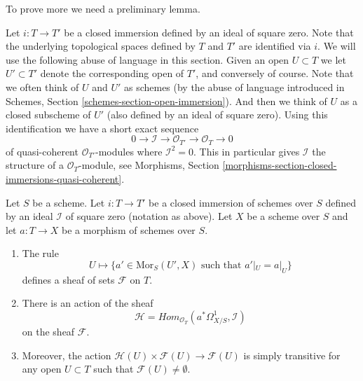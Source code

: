 \noindent
To prove more we need a preliminary lemma.

\medskip\noindent
Let $i : T \to T'$ be a closed immersion defined by an ideal of
square zero. Note that the underlying topological spaces defined
by $T$ and $T'$ are identified via $i$. We will use the following
abuse of language in this section. Given an open $U \subset T$ we
let $U' \subset T'$ denote the corresponding open of $T'$, and
conversely of course. Note that we often think of $U$ and $U'$ as
schemes (by the abuse of language introduced in Schemes,
Section \ref{schemes-section-open-immersion}). And then we think of $U$ as
a closed subscheme of $U'$ (also defined by an ideal of square zero).
Using this identification we have a short exact sequence
$$
0 \to \mathcal{I} \to \mathcal{O}_{T'} \to \mathcal{O}_T \to 0
$$
of quasi-coherent $\mathcal{O}_{T'}$-modules
where $\mathcal{I}^2 = 0$. This in particular gives $\mathcal{I}$
the structure of a $\mathcal{O}_T$-module, see
Morphisms, Section \ref{morphisms-section-closed-immersions-quasi-coherent}.

\begin{lemma}
\label{lemma-action-by-derivations}
Let $S$ be a scheme. Let $i : T \to T'$ be a closed immersion of
schemes over $S$ defined by an ideal $\mathcal{I}$ of square zero
(notation as above). Let $X$ be a scheme over $S$ and let
$a : T \to X$ be a morphism of schemes over $S$.
\begin{enumerate}
\item The rule
$$
U \mapsto \{a' \in \text{Mor}_S(U', X) \text{ such that } a'|_U = a|_U\}
$$
defines a sheaf of sets $\mathcal{F}$ on $T$.
\item There is an action of the sheaf
$$
\mathcal{H} = \textit{Hom}_{\mathcal{O}_T}(a^*\Omega^1_{X/S}, \mathcal{I})
$$
on the sheaf $\mathcal{F}$.
\item Moreover, the action
$\mathcal{H}(U) \times \mathcal{F}(U) \to \mathcal{F}(U)$
is simply transitive for any open $U \subset T$ such that
$\mathcal{F}(U) \not = \emptyset$.
\end{enumerate}
\end{lemma}

